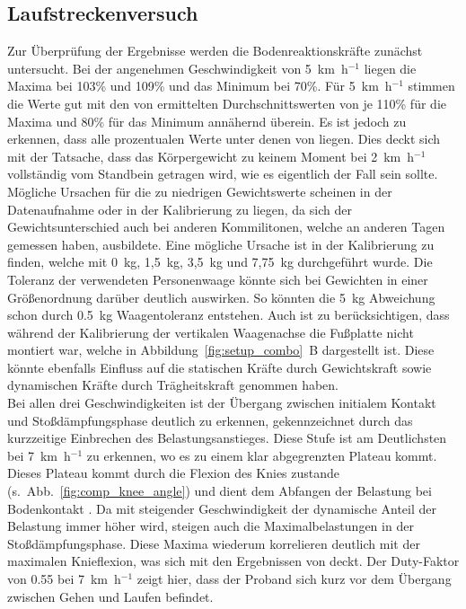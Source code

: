 \subsection{Laufstreckenversuch}
Zur Überprüfung der Ergebnisse werden die Bodenreaktionskräfte zunächst untersucht. Bei der angenehmen Geschwindigkeit von 5~km~h$^{-1}$ liegen die Maxima bei 103\% und 109\% und das Minimum bei 70\%. Für 5~km~h$^{-1}$ stimmen die Werte gut mit den von \textcite{perry2010gait} ermittelten Durchschnittswerten von je 110\% für die Maxima und 80\% für das Minimum annähernd überein. Es ist jedoch zu erkennen, dass alle prozentualen Werte unter denen von \textcite{perry2010gait} liegen. Dies deckt sich mit der Tatsache, dass das Körpergewicht zu keinem Moment bei 2~km~h$^{-1}$ vollständig vom Standbein getragen wird, wie es eigentlich der Fall sein sollte. Mögliche Ursachen für die zu niedrigen Gewichtswerte scheinen in der Datenaufnahme oder in der Kalibrierung zu liegen, da sich der Gewichtsunterschied auch bei anderen Kommilitonen, welche an anderen Tagen gemessen haben, ausbildete. Eine mögliche Ursache ist in der Kalibrierung zu finden, welche mit 0~kg, 1,5~kg, 3,5~kg und 7,75~kg durchgeführt wurde. Die Toleranz der verwendeten Personenwaage könnte sich bei Gewichten in einer Größenordnung darüber deutlich auswirken. So könnten die 5~kg Abweichung schon durch 0.5~kg Waagentoleranz entstehen. Auch ist zu berücksichtigen, dass während der Kalibrierung der vertikalen Waagenachse die Fußplatte nicht montiert war, welche in Abbildung~\ref{fig:setup_combo}~B dargestellt ist. Diese könnte ebenfalls Einfluss auf die statischen Kräfte durch Gewichtskraft sowie dynamischen Kräfte durch Trägheitskraft genommen haben.\\
Bei allen drei Geschwindigkeiten ist der Übergang zwischen initialem Kontakt und Stoßdämpfungsphase deutlich zu erkennen, gekennzeichnet durch das kurzzeitige Einbrechen des Belastungsanstieges. Diese Stufe ist am Deutlichsten bei 7~km~h$^{-1}$ zu erkennen, wo es zu einem klar abgegrenzten Plateau kommt. Dieses Plateau kommt durch die Flexion des Knies zustande (s.~Abb.~\ref{fig:comp_knee_angle}) und dient dem Abfangen der Belastung bei Bodenkontakt \parencite{perry2010gait}. Da mit steigender Geschwindigkeit der dynamische Anteil der Belastung immer höher wird, steigen auch die Maximalbelastungen in der Stoßdämpfungsphase. Diese Maxima wiederum korrelieren deutlich mit der maximalen Knieflexion, was sich mit den Ergebnissen von \textcite{kirtley1985influence} deckt. Der Duty-Faktor von 0.55 bei 7~km~h$^{-1}$ zeigt hier, dass der Proband sich kurz vor dem Übergang zwischen Gehen und Laufen befindet.\\
